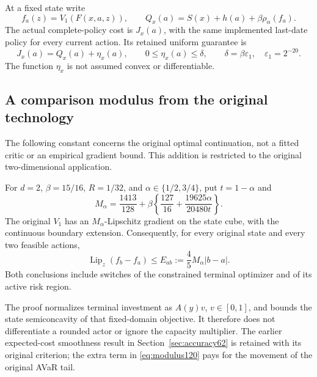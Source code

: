 At a fixed state write
\[
 f_a(z)=V_1(F(x,a,z)),\qquad
 Q_x(a)=S(x)+h(a)+\beta\rho_\alpha(f_a).
\]
The actual complete-policy cost is $J_x(a)$, with the same implemented
last-date policy for every current action.  Its retained uniform guarantee is
\begin{equation}\label{eq:future120}
 J_x(a)=Q_x(a)+\eta_x(a),\qquad
 0\le\eta_x(a)\le\delta,\qquad
 \delta=\beta\varepsilon_1,\quad \varepsilon_1=2^{-20}.
\end{equation}
The function $\eta_x$ is not assumed convex or differentiable.

\subsection{A comparison modulus from the original technology}
The following constant concerns the original optimal continuation, not a
fitted critic or an empirical gradient bound.  This addition is restricted
to the original two-dimensional application.

\begin{theorem}
\label{thm:modulus120}
For $d=2$, $\beta=15/16$, $R=1/32$, and
$\alpha\in\{1/2,3/4\}$, put $t=1-\alpha$ and
\begin{equation}\label{eq:modulus120}
 M_\alpha=\frac{1413}{128}
       +\beta\left\{\frac{127}{16}
                 +\frac{19625\alpha}{20480t}\right\}.
\end{equation}
The original $V_1$ has an $M_\alpha$-Lipschitz gradient on the state
cube, with the continuous boundary extension.  Consequently, for every
original state and every two feasible actions,
\begin{equation}\label{eq:mixedmodulus120}
 \operatorname{Lip}_z(f_b-f_a)
 \le E_{ab}:=\frac45M_\alpha|b-a|.
\end{equation}
Both conclusions include switches of the constrained terminal optimizer
and of its active risk region.
\end{theorem}

The proof normalizes terminal investment as $A(y)v$, $v\in[0,1]$,
and bounds the state semiconcavity of that fixed-domain objective.
It therefore does not differentiate a rounded actor or ignore the
capacity multiplier.  The earlier expected-cost smoothness result in
Section~\ref{sec:accuracy62} is retained with its original criterion;
the extra term in \eqref{eq:modulus120} pays for the movement of the
original AVaR tail.

